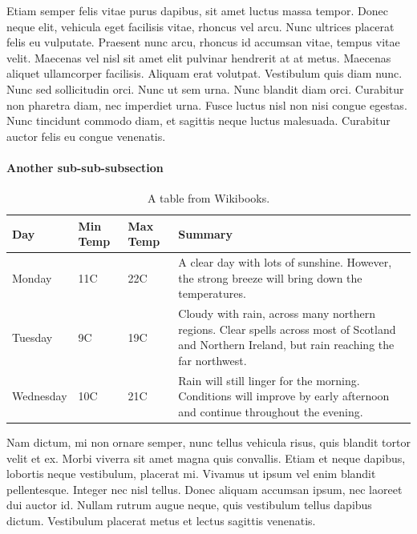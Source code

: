 \documentclass{article}
\begin{document}
Etiam semper felis vitae purus dapibus, sit amet luctus massa tempor. Donec neque elit, vehicula eget facilisis vitae, rhoncus vel arcu. Nunc ultrices placerat felis eu vulputate. Praesent nunc arcu, rhoncus id accumsan vitae, tempus vitae velit. Maecenas vel nisl sit amet elit pulvinar hendrerit at at metus. Maecenas aliquet ullamcorper facilisis. Aliquam erat volutpat. Vestibulum quis diam nunc. Nunc sed sollicitudin orci. Nunc ut sem urna. Nunc blandit diam orci. Curabitur non pharetra diam, nec imperdiet urna. Fusce luctus nisl non nisi congue egestas. Nunc tincidunt commodo diam, et sagittis neque luctus malesuada. Curabitur auctor felis eu congue venenatis.


\paragraph{Another sub-sub-subsection}
\label{paragraph: Another sub-sub-subsection}

\begin{table}[h]
    \caption[A table.]{A table from Wikibooks.}
    \label{table: Table}          %
    \begin{center}
        \begin{tabular}{ l | l  l  p{5cm} }
        \toprule
        Day & Min Temp & Max Temp & Summary \\ \midrule
        Monday & 11C & 22C & A clear day with lots of sunshine.  
        However, the strong breeze will bring down the temperatures. \\ \midrule
        Tuesday & 9C & 19C & Cloudy with rain, across many northern regions. Clear spells 
        across most of Scotland and Northern Ireland, 
        but rain reaching the far northwest. \\ \midrule
        Wednesday & 10C & 21C & Rain will still linger for the morning. 
        Conditions will improve by early afternoon and continue 
        throughout the evening. \\
        \bottomrule
        \end{tabular}
    \end{center}
\end{table}


Nam dictum, mi non ornare semper, nunc tellus vehicula risus, quis blandit tortor velit et ex. Morbi viverra sit amet magna quis convallis. Etiam et neque dapibus, lobortis neque vestibulum, placerat mi. Vivamus ut ipsum vel enim blandit pellentesque. Integer nec nisl tellus. Donec aliquam accumsan ipsum, nec laoreet dui auctor id. Nullam rutrum augue neque, quis vestibulum tellus dapibus dictum. Vestibulum placerat metus et lectus sagittis venenatis.
\end{document}
